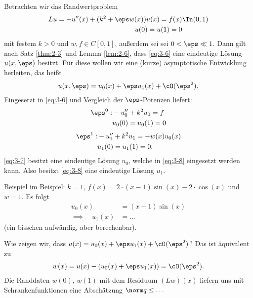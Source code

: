 \begin{beispiel}\label{ex:3-5}
  Betrachten wir das Randwertproblem
  \begin{align}\label{eq:3-6}
    Lu = - u''(x) + (k^{2} + \eps w(x)) u(x) = f(x)&\In (0, 1)\\
    u(0) = u(1) = 0 &\notag
  \end{align}
  mit festem $k> 0$ und $w, f \in C[0, 1]$, außerdem sei sei $0< \eps \ll 1$. Dann gilt nach Satz \ref{thm:2-3} und Lemma \ref{lem:2-6}, dass \eqref{eq:3-6} eine eindeutige Lösung $u(x, \eps)$ besitzt. Für diese wollen wir eine (kurze) asymptotische Entwicklung herleiten, das heißt
\begin{align*}
  u(x, \eps) = u_{0}(x) + \eps u_{1}(x) + \cO(\eps^{2}). 
\end{align*}
Eingesetzt in \eqref{eq:3-6} und Vergleich der $\eps$-Potenzen liefert:
\begin{align}\label{eq:3-7}
  \eps^{0}:& - u_{0}'' + k^{2} u_{0} = f\\
  &u_{0}(0) = u_{0}(1) = 0 \notag 
\end{align}
\begin{align}\label{eq:3-8}
  \eps^{1}:& - u_{1}'' + k^{2} u_{1} = -w(x) u_{0}(x)\\
  &u_{1}(0) = u_{1}(1) = 0 \notag. 
\end{align}
\eqref{eq:3-7} besitzt eine eindeutige Lösung $u_{0}$, welche in \eqref{eq:3-8} eingesetzt werden kann. Also besitzt \eqref{eq:3-8} eine eindeutige Lösung $u_{1}$. 

Beispiel im Beispiel: $k = 1$, $f(x) = 2\cdot(x-1) \sin(x) - 2\cdot \cos (x)$ und $w = 1$. Es folgt
\begin{align*}
  u_{0}(x) &= (x-1) \sin(x)\\
  \implies \quad u_{1}(x) &= \dots
\end{align*}
(ein bisschen aufwändig, aber berechenbar).

\vspace{5mm}

Wie zeigen wir, dass $u(x) = u_{0}(x) + \eps u_{1}(x) + \cO(\eps^{2})$? Das ist äquivalent zu
\begin{align*}
  w(x) = u(x) - (u_{0}(x) + \eps u_{1}(x)) = \cO(\eps^{2}). 
\end{align*}
Die Randdaten $w(0)$, $w(1)$ mit dem Residuum $(Lw)(x)$ liefern uns mit Schrankenfunktionen eine Abschätzung $\norm q \leq \dots$

\vspace{5mm}


\end{beispiel}
